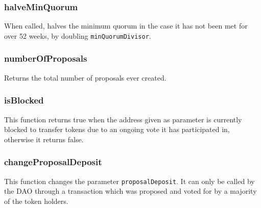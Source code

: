 \documentclass[9pt,oneside]{amsart}
\begin{document}
\begin{multicols}{2}
\subsubsection*{halveMinQuorum}
When called, halves the minimum quorum in the case it has not been met for over 52 weeks, by doubling \verb|minQuorumDivisor|.

\subsubsection*{numberOfProposals}
Returns the total number of proposals ever created.

\subsubsection*{isBlocked}
This function returns true when the address given as parameter is currently blocked to transfer tokens due to an ongoing vote it has participated in, otherwise it returns false.

\subsubsection*{changeProposalDeposit}
This function changes the parameter \verb|proposalDeposit|. It can only be called by the DAO through a transaction which was proposed and voted for by a majority of the token holders.


\end{multicols}
\end{document}
